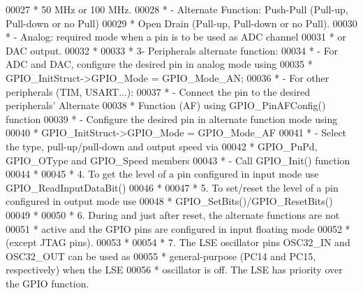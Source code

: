 \begin{DoxyCode}
00027 \textcolor{comment}{  *                  50 MHz or 100 MHz.}
00028 \textcolor{comment}{  *                - Alternate Function: Push-Pull (Pull-up, Pull-down or no Pull)}
00029 \textcolor{comment}{  *                                      Open Drain (Pull-up, Pull-down or no Pull).}
00030 \textcolor{comment}{  *                - Analog: required mode when a pin is to be used as ADC channel}
00031 \textcolor{comment}{  *                          or DAC output.}
00032 \textcolor{comment}{  * }
00033 \textcolor{comment}{  *          3- Peripherals alternate function:}
00034 \textcolor{comment}{  *              - For ADC and DAC, configure the desired pin in analog mode using }
00035 \textcolor{comment}{  *                  GPIO\_InitStruct->GPIO\_Mode = GPIO\_Mode\_AN;}
00036 \textcolor{comment}{  *              - For other peripherals (TIM, USART...):}
00037 \textcolor{comment}{  *                 - Connect the pin to the desired peripherals' Alternate }
00038 \textcolor{comment}{  *                   Function (AF) using GPIO\_PinAFConfig() function}
00039 \textcolor{comment}{  *                 - Configure the desired pin in alternate function mode using}
00040 \textcolor{comment}{  *                   GPIO\_InitStruct->GPIO\_Mode = GPIO\_Mode\_AF}
00041 \textcolor{comment}{  *                 - Select the type, pull-up/pull-down and output speed via }
00042 \textcolor{comment}{  *                   GPIO\_PuPd, GPIO\_OType and GPIO\_Speed members}
00043 \textcolor{comment}{  *                 - Call GPIO\_Init() function}
00044 \textcolor{comment}{  *        }
00045 \textcolor{comment}{  *          4. To get the level of a pin configured in input mode use GPIO\_ReadInputDataBit()}
00046 \textcolor{comment}{  *          }
00047 \textcolor{comment}{  *          5. To set/reset the level of a pin configured in output mode use}
00048 \textcolor{comment}{  *             GPIO\_SetBits()/GPIO\_ResetBits()}
00049 \textcolor{comment}{  *               }
00050 \textcolor{comment}{  *          6. During and just after reset, the alternate functions are not }
00051 \textcolor{comment}{  *             active and the GPIO pins are configured in input floating mode}
00052 \textcolor{comment}{  *             (except JTAG pins).}
00053 \textcolor{comment}{  *}
00054 \textcolor{comment}{  *          7. The LSE oscillator pins OSC32\_IN and OSC32\_OUT can be used as }
00055 \textcolor{comment}{  *             general-purpose (PC14 and PC15, respectively) when the LSE}
00056 \textcolor{comment}{  *             oscillator is off. The LSE has priority over the GPIO function.}

\end{DoxyCode}
